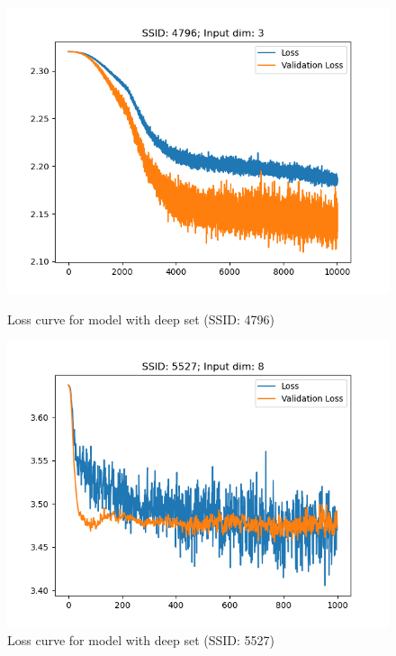 \documentclass[12pt, twoside, ngerman]{report}
\begin{document}
\begin{figure}[h]%
\centering
\begin{minipage}{0.45\textwidth}
\includegraphics[width=\textwidth]{images/DeepSetLoss4796}
\caption{Loss curve for model with deep set (SSID: 4796)}
    \label{fig:DeepSetLoss4796}
\end{minipage}\hfill
\begin{minipage}{0.45\textwidth}
\includegraphics[width=\textwidth]{images/DeepSetLoss5527}
\caption{Loss curve for model with deep set (SSID: 5527)}
    \label{fig:DeepSetLoss5527}
\end{minipage}
\end{figure}
\end{document}
